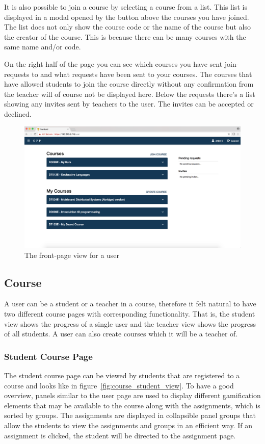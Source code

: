 It is also possible to join a course by selecting a course from a list. This list is displayed in a modal opened by the button above the courses you have joined.  The list does not only show the course code or the name of the course but also the creator of the course. This is because there can be many courses with the same name and/or code.

On the right half of the page you can see which courses you have sent join-requests to and what requests have been sent to your courses. The courses that have allowed students to join the course directly without any confirmation from the teacher will of course not be displayed here. Below the requests there's a list showing any invites sent by teachers to the user. The invites can be accepted or declined.
\begin{figure}[H]
    \centering
    \includegraphics[width=.5\textwidth]{img/gppinpictures/user.png}
    \caption{The front-page view for a user}
    \label{fig:frontpage_student_view}
\end{figure}

\subsection{Course}
A user can be a student or a teacher in a course, therefore it felt natural to have two different course pages with corresponding functionality. That is, the student view shows the progress of a single user and the teacher view shows the progress of all students. A user can also create courses which it will be a teacher of. 

\subsubsection{Student Course Page}
The student course page can be viewed by students that are registered to a course and looks like in figure~\ref{fig:course_student_view}. To have a good overview, panels similar to the user page are used to display different gamification elements that may be available to the course along with the assignments, which is sorted by groups. The assignments are displayed in collapsible panel groups that allow the students to view the assignments and groups in an efficient way. If an assignment is clicked, the student will be directed to the assignment page.

